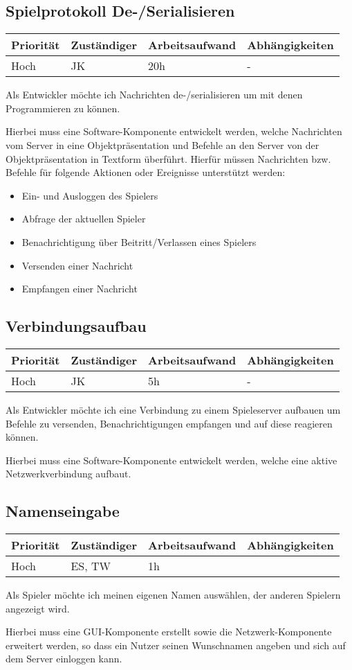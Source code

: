 \documentclass[a4paper]{scrreprt}
\newenvironment{requirement}[5] {
	\subsection{#1}
	\begin{tabularx}{\textwidth}{|X|l|X|X|}
		\hline
		Priorität & Zuständiger & Arbeitsaufwand & Abhängigkeiten \\
		\hline
		#2 & #3 & #4 & #5 \\
		\hline
	\end{tabularx}
	}{
	\newpage
	}
\begin{document}
\begin{requirement}{Spielprotokoll De-/Serialisieren}{Hoch}{JK}{20h}{-}

\begin{center}
	Als Entwickler möchte ich Nachrichten de-/serialisieren um mit denen Programmieren zu können.
\end{center}

Hierbei muss eine Software-Komponente entwickelt werden, welche Nachrichten vom Server in eine Objektpräsentation und Befehle an den Server von der Objektpräsentation in Textform 
überführt. Hierfür müssen Nachrichten bzw. Befehle für folgende Aktionen oder Ereignisse unterstützt werden:
\begin{itemize}
	\item Ein- und Ausloggen des Spielers
	\item Abfrage der aktuellen Spieler
	\item Benachrichtigung über Beitritt/Verlassen eines Spielers
	\item Versenden einer Nachricht
	\item Empfangen einer Nachricht
\end{itemize}
\end{requirement}


\begin{requirement}{Verbindungsaufbau}{Hoch}{JK}{5h}{-}

\begin{center}
	Als Entwickler möchte ich eine Verbindung zu einem Spieleserver aufbauen um Befehle zu versenden, Benachrichtigungen empfangen und auf diese reagieren können.
\end{center}

Hierbei muss eine Software-Komponente entwickelt werden, welche eine aktive Netzwerkverbindung aufbaut.

\end{requirement}


\begin{requirement}{Namenseingabe}{Hoch}{ES, TW}{1h}{}

\begin{center}
	Als Spieler möchte ich meinen eigenen Namen auswählen, der anderen Spielern angezeigt wird.
\end{center}

Hierbei muss eine GUI-Komponente erstellt sowie die Netzwerk-Komponente erweitert werden, so dass ein Nutzer seinen Wunschnamen angeben und sich auf dem Server einloggen kann.

\end{requirement}
\end{document}
